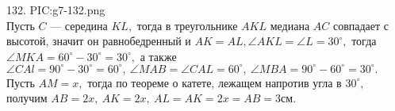 132. {{PIC:g7-132.png}}\\
Пусть $C$ --- середина $KL,$ тогда в треугольнике $AKL$ медиана $AC$ совпадает с высотой, значит он равнобедренный и  $AK=AL, \angle AKL=\angle L=30^\circ,$ тогда $\angle MKA=60^\circ-30^\circ=30^\circ,$ а также $\angle CAl=90^\circ-30^\circ=60^\circ,\ \angle MAB=\angle CAL=60^\circ,\ \angle MBA=90^\circ-60^\circ=30^\circ.$
Пусть $AM=x,$ тогда по теореме о катете, лежащем напротив угла в $30^\circ,$ получим $AB=2x,\ AK=2x,\ AL=AK=2x=AB=3$см.\\
